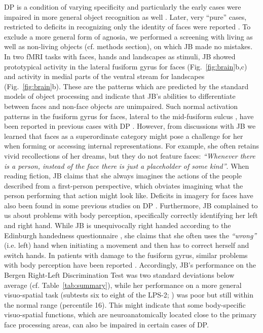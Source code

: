 \documentclass[fleqn,10pt]{SelfArx} %
\begin{document}
DP is a condition of varying specificity and particularly the early cases were impaired in more general object recognition as well \citep{McConachie_1976, Ariel_1996}. Later, very “pure” cases, restricted to deficits in recognizing only the identity of faces were reported \citep{Nunn_2001, Bentin_1999, Duchaine_2005}. To exclude a more general form of agnosia, we performed a screening with living as well as non-living objects (cf. methods section), on which JB made no mistakes. In two fMRI tasks with faces, hands and landscapes as stimuli, JB showed prototypical activity in the lateral fusiform gyrus for faces (Fig.~\ref{fig:brain}b,c) and activity in medial parts of the ventral stream for landscapes (Fig.~\ref{fig:brain}b). These are the patterns which are predicted by the standard models of object processing \citep{Grill_Spector_2014} and indicate that JB's abilities to differentiate between faces and non-face objects are unimpaired. Such normal activation patterns in the fusiform gyrus for faces, lateral to the mid-fusiform sulcus \citep{Weiner_2014}, have been reported in previous cases with DP \citep{Hasson_2003, Avidan_2005, Furl_2011}. However, from discussions with JB we learned that faces as a superordinate category might pose a challenge for her when forming or accessing internal representations. For example, she often retains vivid recollections of her dreams, but they do not feature faces: \textit{“Whenever there is a person, instead of the face there is just a placeholder of some kind”}. When reading fiction, JB claims that she always imagines the actions of the people described from a first-person perspective, which obviates imagining what the person performing that action might look like. Deficits in imagery for faces have also been found in some previous studies on DP \citep{Gr_ter_2009, Tree_2010}.
Furthermore, JB complained to us about problems with body perception, specifically correctly identifying her left and right hand. While JB is unequivocally right handed according to the Edinburgh handedness questionnaire \citep{Oldfield_1971}, she claims that she often uses the \textit{“wrong”} (i.e. left) hand when initiating a movement and then has to correct herself and switch hands. In patients with damage to the fusiform gyrus, similar problems with body perception have been reported \citep{Grewe_2014}. Accordingly, JB's performance on the Bergen Right-Left Discrimination Test \citep{Ofte_2002} was two standard deviations below average (cf. Table~\ref{tab:summary}), while her performance on a more general visuo-spatial task (subtests six to eight of the LPS-2; \citet{Horn}) was poor but still within the normal range (percentile 16). This might indicate that some body-specific visuo-spatial functions, which are neuroanatomically located close to the primary face processing areas, can also be impaired in certain cases of DP.
\end{document}
